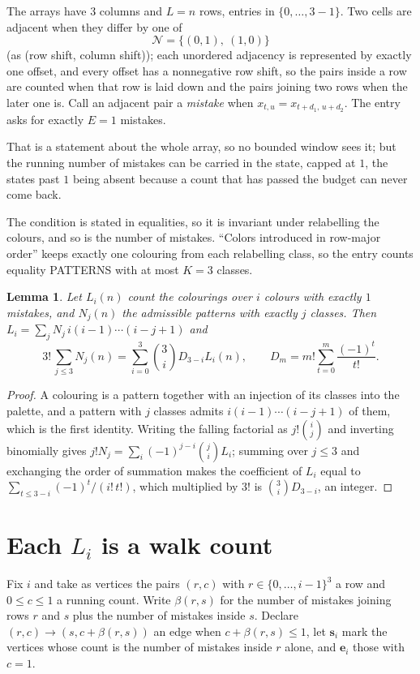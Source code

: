 \documentclass[11pt,a4paper]{article}
\theoremstyle{plain}
\newtheorem{lemma}[theorem]{Lemma}
\theoremstyle{definition}
\begin{document}
The arrays have $3$ columns and $L=n$ rows, entries in $\{0,\dots,3-1\}$.
Two cells are adjacent when they differ by one of
\[
\mathcal N=\{(0,1),\ (1,0)\}
\]
(as (row shift, column shift)); each unordered adjacency is represented by exactly one
offset, and every offset has a nonnegative row shift, so the pairs inside a row are
counted when that row is laid down and the pairs joining two rows when the later one
is. Call an adjacent pair a \emph{mistake} when $x_{t,u}=x_{t+d_1,\,u+d_2}$. The entry asks for exactly
$E=1$ mistakes.

That is a statement about the whole array, so no bounded window sees it; but the running
number of mistakes can be carried in the state, capped at $1$, the states past $1$ being
absent because a count that has passed the budget can never come back.

The condition is stated in equalities, so it is invariant under relabelling the colours, and
so is the number of mistakes. ``Colors introduced in row-major order'' keeps exactly one
colouring from each relabelling class, so the entry counts equality PATTERNS with at most
$K=3$ classes.

\begin{lemma}\label{lem:inv}
Let $L_i(n)$ count the colourings over $i$ colours with exactly $1$ mistakes, and $N_j(n)$
the admissible patterns with exactly $j$ classes. Then
$L_i=\sum_j N_j\,i(i-1)\cdots(i-j+1)$ and
\[
3!\,\sum_{j\le3}N_j(n)=\sum_{i=0}^{3}\binom{3}{i}D_{3-i}L_i(n),
\qquad D_m=m!\sum_{t=0}^{m}\frac{(-1)^t}{t!} .
\]
\end{lemma}

\begin{proof}
A colouring is a pattern together with an injection of its classes into the palette, and a
pattern with $j$ classes admits $i(i-1)\cdots(i-j+1)$ of them, which is the first identity.
Writing the falling factorial as $j!\binom{i}{j}$ and inverting binomially gives
$j!N_j=\sum_i(-1)^{j-i}\binom{j}{i}L_i$; summing over $j\le3$ and exchanging the order
of summation makes the coefficient of $L_i$ equal to $\sum_{t\le3-i}(-1)^t/(i!\,t!)$,
which multiplied by $3!$ is $\binom{3}{i}D_{3-i}$, an integer.
\end{proof}

\section{Each $L_i$ is a walk count}

Fix $i$ and take as vertices the pairs $(r,c)$ with $r\in\{0,\dots,i-1\}^{3}$ a row
and $0\le c\le1$ a running count. Write $\beta(r,s)$ for the number of mistakes joining
rows $r$ and $s$ plus the number of mistakes inside $s$. Declare $(r,c)\to(s,c+\beta(r,s))$
an edge when $c+\beta(r,s)\le1$, let $\mathbf{s}_i$ mark the vertices whose count is the
number of mistakes inside $r$ alone, and $\mathbf{e}_i$ those with $c=1$.
\end{document}
